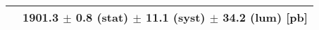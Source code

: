\begin{tabular}{lc}
\hline
                               & 1901.3 $\pm$ 0.8 (stat) $\pm$ 11.1 (syst) $\pm$ 34.2 (lum) [pb]  \\
\hline
\end{tabular}
